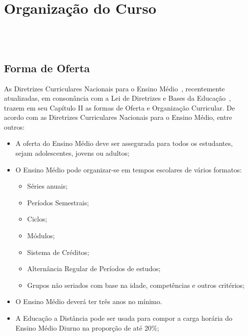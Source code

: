\documentclass[11pt,fleqn]{book} %
\begin{document}

\chapter{Organização do Curso}
\vspace{6em}
\begin{flushright}
	\textit{\textcolor{white}{``O homem, por ser inacabado, tende à perfeição. A educação é, portanto, um
			processo contínuo que só acaba com a morte'' (FURTER, 1973).}}
\end{flushright}
\vspace{12em}

\section{Forma de Oferta}\label{carga}
\indent

As Diretrizes Curriculares Nacionais para o Ensino Médio~\cite{Resolucao032018}, recentemente atualizadas, em consonância com a Lei de Diretrizes e Bases da Educação~\cite{Lei19394De1996}, trazem em seu Capítulo II as formas de Oferta e Organização Curricular. 
De acordo com as Diretrizes Curriculares Nacionais para o Ensino Médio, entre outros:

\begin{itemize}
	\item A oferta do Ensino Médio deve ser assegurada para todos os estudantes, sejam adolescentes,
	jovens ou adultos;
	\item O Ensino Médio pode organizar-se em tempos escolares de vários formatos:
	\begin{itemize}
		\item Séries anuais;
		\item Períodos Semestrais;
		\item Ciclos;
		\item Módulos;
		\item Sistema de Créditos;
		\item Alternância Regular de Períodos de estudos;
		\item Grupos não seriados com base na idade, competências e outros critérios;
	\end{itemize}
	\item O Ensino Médio deverá ter três anos no mínimo.
	\item A Educação a Distância pode ser usada para compor a carga horária do Ensino Médio Diurno na proporção de até 20\%;
\end{itemize}
\end{document}
